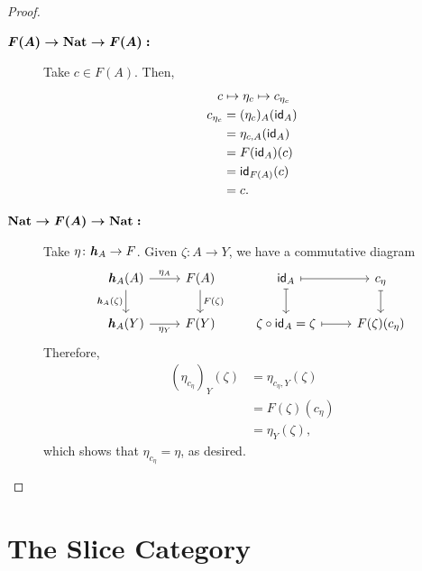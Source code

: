 \begin{proof}
    \begin{description}
        \item[$\textrm{\boldmath$F(A)\to\operatorname{Nat}\to F(A):$}$] Take $c\in F(A)$. Then,
        \begin{align*}
            c&\mapsto\eta_c\mapsto c_{\eta_c}\\
            c_{\eta_c} &= (\eta_c)_A(\mathsf{id}_A)\\
                &= \eta_{c,A}(\mathsf{id}_A)\\
                &= F(\mathsf{id}_A)(c)\\
                &= \mathsf{id}_{F(A)}(c)\\
                &= c.
        \end{align*}
        \item[$\textrm{\boldmath$\operatorname{Nat}\to F(A)\to\operatorname{Nat}:$}$] Take $\eta\colon\yoneda_A\to F$. Given $\zeta\colon A\to Y$, we have a commutative diagram
        $$
            \begin{tikzcd}
                \yoneda_A(A)
                        \arrow[d,"\yoneda_A(\zeta)"']
                        \arrow[r,"\eta_A"]
                    &F(A)
                        \arrow[d,"F(\zeta)"]
                    &\id_A
                        \arrow[r,mapsto]
                        \arrow[d,mapsto]
                    &c_\eta
                        \arrow[d,mapsto]\\
                \yoneda_A(Y)
                        \arrow[r,"\eta_Y"']
                    &F(Y)&\zeta\circ\id_A=\zeta
                        \arrow[r,mapsto]
                    &F(\zeta)(c_\eta)
            \end{tikzcd}
        $$
        Therefore,
        \begin{align*}
            (\eta_{c_\eta})_Y(\zeta) &= \eta_{c_\eta,Y}(\zeta)\\
                &= F(\zeta)(c_\eta)\\
                &= \eta_Y(\zeta),
        \end{align*}
        which shows that $\eta_{c_\eta}=\eta$, as desired.
    \end{description}
\end{proof}

\section{The Slice Category}\label{slice-category}

